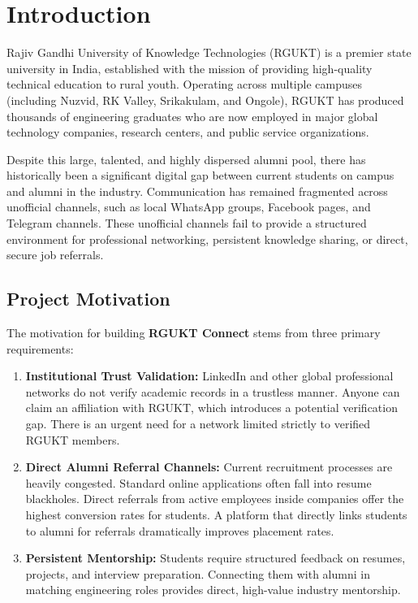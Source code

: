 \chapter{Introduction}
\label{ch:introduction}

Rajiv Gandhi University of Knowledge Technologies (RGUKT) is a premier state university in India, established with the mission of providing high-quality technical education to rural youth. Operating across multiple campuses (including Nuzvid, RK Valley, Srikakulam, and Ongole), RGUKT has produced thousands of engineering graduates who are now employed in major global technology companies, research centers, and public service organizations. 

Despite this large, talented, and highly dispersed alumni pool, there has historically been a significant digital gap between current students on campus and alumni in the industry. Communication has remained fragmented across unofficial channels, such as local WhatsApp groups, Facebook pages, and Telegram channels. These unofficial channels fail to provide a structured environment for professional networking, persistent knowledge sharing, or direct, secure job referrals.

\section{Project Motivation}
The motivation for building \textbf{RGUKT Connect} stems from three primary requirements:
\begin{enumerate}
    \item \textbf{Institutional Trust Validation:} LinkedIn and other global professional networks do not verify academic records in a trustless manner. Anyone can claim an affiliation with RGUKT, which introduces a potential verification gap. There is an urgent need for a network limited strictly to verified RGUKT members.
    \item \textbf{Direct Alumni Referral Channels:} Current recruitment processes are heavily congested. Standard online applications often fall into resume blackholes. Direct referrals from active employees inside companies offer the highest conversion rates for students. A platform that directly links students to alumni for referrals dramatically improves placement rates.
    \item \textbf{Persistent Mentorship:} Students require structured feedback on resumes, projects, and interview preparation. Connecting them with alumni in matching engineering roles provides direct, high-value industry mentorship.
\end{enumerate}


